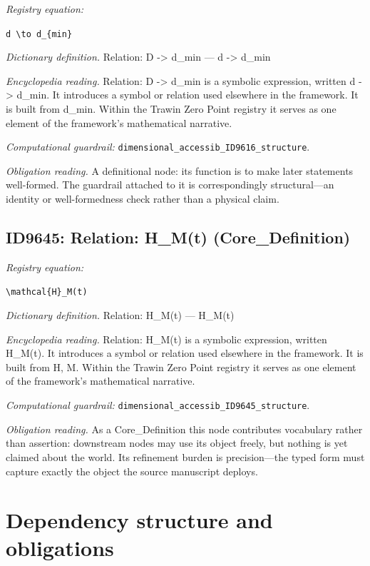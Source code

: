 \documentclass[11pt]{article}
\theoremstyle{remark}
\begin{document}
\noindent\textit{Registry equation:}\par
{\small\texttt{d \textbackslash{}to d\_\{min\}}}\par\medskip
\noindent\textit{Dictionary definition.} Relation: D -> d\_min --- d -> d\_min\par\medskip
\noindent\textit{Encyclopedia reading.} Relation: D -> d\_min is a symbolic expression, written d -> d\_min. It introduces a symbol or relation used elsewhere in the framework. It is built from d\_min. Within the Trawin Zero Point registry it serves as one element of the framework's mathematical narrative.
\par\medskip\noindent\textit{Computational guardrail:} \texttt{dimensional\_accessib\_ID9616\_structure}.
\par\medskip\noindent\textit{Obligation reading.} A definitional node: its function is to make later statements well-formed. The guardrail attached to it is correspondingly structural---an identity or well-formedness check rather than a physical claim.

\subsection{ID9645: Relation: H\_M(t) (Core\_Definition)}

\noindent\textit{Registry equation:}\par
{\small\texttt{\textbackslash{}mathcal\{H\}\_M(t)}}\par\medskip
\noindent\textit{Dictionary definition.} Relation: H\_M(t) --- H\_M(t)\par\medskip
\noindent\textit{Encyclopedia reading.} Relation: H\_M(t) is a symbolic expression, written H\_M(t). It introduces a symbol or relation used elsewhere in the framework. It is built from H, M. Within the Trawin Zero Point registry it serves as one element of the framework's mathematical narrative.
\par\medskip\noindent\textit{Computational guardrail:} \texttt{dimensional\_accessib\_ID9645\_structure}.
\par\medskip\noindent\textit{Obligation reading.} As a Core\_Definition this node contributes vocabulary rather than assertion: downstream nodes may use its object freely, but nothing is yet claimed about the world. Its refinement burden is precision---the typed form must capture exactly the object the source manuscript deploys.

\section{Dependency structure and obligations}
\label{sec:dep}
\end{document}

